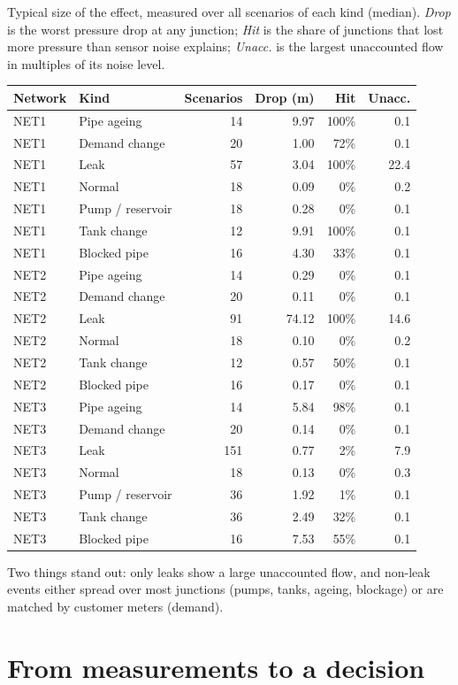 \documentclass[11pt,a4paper]{article}
\begin{document}
Typical size of the effect, measured over all scenarios of each kind (median). \emph{Drop} is the worst pressure drop at any junction; \emph{Hit} is the share of junctions that lost more pressure than sensor noise explains; \emph{Unacc.} is the largest unaccounted flow in multiples of its noise level.
{\small\begin{longtable}{@{}llrrrr@{}}
\toprule
Network & Kind & Scenarios & Drop (m) & Hit & Unacc. \\
\midrule
\endhead
NET1 & Pipe ageing & 14 & 9.97 & 100\% & 0.1 \\
NET1 & Demand change & 20 & 1.00 & 72\% & 0.1 \\
NET1 & Leak & 57 & 3.04 & 100\% & 22.4 \\
NET1 & Normal & 18 & 0.09 & 0\% & 0.2 \\
NET1 & Pump / reservoir & 18 & 0.28 & 0\% & 0.1 \\
NET1 & Tank change & 12 & 9.91 & 100\% & 0.1 \\
NET1 & Blocked pipe & 16 & 4.30 & 33\% & 0.1 \\
NET2 & Pipe ageing & 14 & 0.29 & 0\% & 0.1 \\
NET2 & Demand change & 20 & 0.11 & 0\% & 0.1 \\
NET2 & Leak & 91 & 74.12 & 100\% & 14.6 \\
NET2 & Normal & 18 & 0.10 & 0\% & 0.2 \\
NET2 & Tank change & 12 & 0.57 & 50\% & 0.1 \\
NET2 & Blocked pipe & 16 & 0.17 & 0\% & 0.1 \\
NET3 & Pipe ageing & 14 & 5.84 & 98\% & 0.1 \\
NET3 & Demand change & 20 & 0.14 & 0\% & 0.1 \\
NET3 & Leak & 151 & 0.77 & 2\% & 7.9 \\
NET3 & Normal & 18 & 0.13 & 0\% & 0.3 \\
NET3 & Pump / reservoir & 36 & 1.92 & 1\% & 0.1 \\
NET3 & Tank change & 36 & 2.49 & 32\% & 0.1 \\
NET3 & Blocked pipe & 16 & 7.53 & 55\% & 0.1 \\
\bottomrule
\end{longtable}}
Two things stand out: only leaks show a large unaccounted flow, and non-leak events either spread over most junctions (pumps, tanks, ageing, blockage) or are matched by customer meters (demand).

\section{From measurements to a decision}
\end{document}
